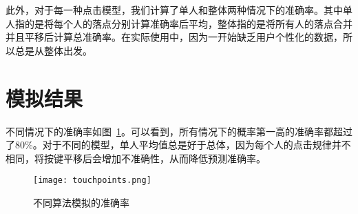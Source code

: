 此外，对于每一种点击模型，我们计算了单人和整体两种情况下的准确率。其中单人指的是将每个人的落点分别计算准确率后平均，整体指的是将所有人的落点合并并且平移后计算总准确率。在实际使用中，因为一开始缺乏用户个性化的数据，所以总是从整体出发。

\section{模拟结果}
不同情况下的准确率如图~\ref{fig:simulation}。可以看到，所有情况下的概率第一高的准确率都超过了80\%。对于不同的模型，单人平均值总是好于总体，因为每个人的点击规律并不相同，将按键平移后会增加不准确性，从而降低预测准确率。

\begin{figure}[h] %
    \centering
    \texttt{[image: touchpoints.png]}
    \caption{不同算法模拟的准确率}
    \label{fig:simulation}
\end{figure}